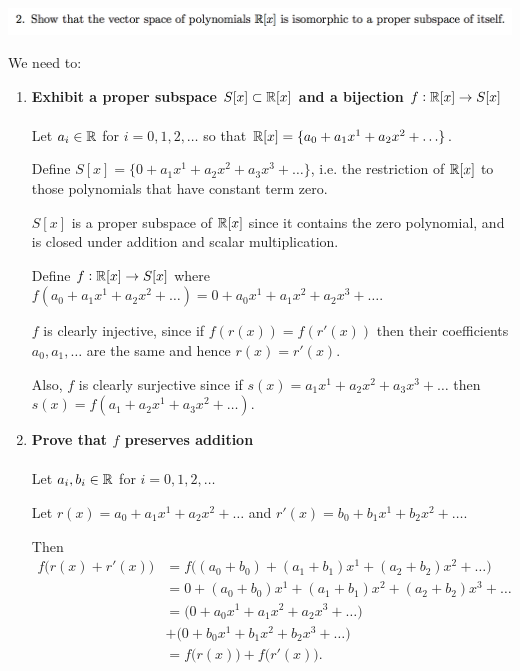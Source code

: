 \subsubsection{} %
\begin{mdframed}
  \includegraphics[width=450pt]{img/linear-algebra-a0-1-2.png}\\
\end{mdframed}
We need to:
\begin{enumerate}
\item \textbf{Exhibit a proper subspace $S[x] \subset \mathbb{R}[x]$ and a bijection $f:\mathbb{R}[x] \to S[x]$}\\\\
  Let $a_i \in \mathbb{R}$ for $i = 0, 1, 2, \ldots$ so that
  $\mathbb{R}[x] = \{a_0 + a_1x^1 + a_2x^2 + \ldots\}$.

  Define $S[x] = \{0 + a_1x^1 + a_2x^2 + a_3x^3 + \ldots\}$, i.e. the restriction
  of $\mathbb{R}[x]$ to those polynomials that have constant term zero.

  $S[x]$ is a proper subspace of $\mathbb{R}[x]$ since it contains the zero polynomial,
  and is closed under addition and scalar multiplication.

  Define $f: \mathbb{R}[x] \to S[x]$ where
  $f(a_0 + a_1x^1 + a_2x^2 + \ldots) = 0 + a_0x^1 + a_1x^2 + a_2x^3 + \ldots$.

  $f$ is clearly injective, since if $f(r(x)) = f(r'(x))$ then their
  coefficients $a_0, a_1, \ldots$ are the same and hence $r(x) = r'(x)$.

  Also, $f$ is clearly surjective since if
  $s(x) = a_1x^1 + a_2x^2 + a_3x^3 + \ldots$ then
  $s(x) = f(a_1 + a_2x^1 + a_3x^2 + \ldots)$.

\item \textbf{Prove that $f$ preserves addition}\\\\
  Let $a_i,b_i \in \mathbb{R}$ for $i = 0, 1, 2, \ldots$

  Let $r(x) = a_0 + a_1x^1 + a_2x^2 + \ldots$ and $r'(x) = b_0 + b_1x^1 + b_2x^2 + \ldots$.

  Then
  \begin{align*}
    f\Big(r(x) + r'(x)\Big)
    &= f\Big((a_0 + b_0) + (a_1 + b_1)x^1 + (a_2 + b_2)x^2 + \ldots\Big)\\
    &= 0 + (a_0 + b_0)x^1 + (a_1 + b_1)x^2 + (a_2 + b_2)x^3 + \ldots\\
    &= \Big(0 + a_0x^1 + a_1x^2 + a_2x^3 + \ldots \Big) \\
    &+ \Big(0 + b_0x^1 + b_1x^2 + b_2x^3 + \ldots \Big) \\
    &= f\Big(r(x)\Big) + f\Big(r'(x)\Big).
  \end{align*}


\end{enumerate}
